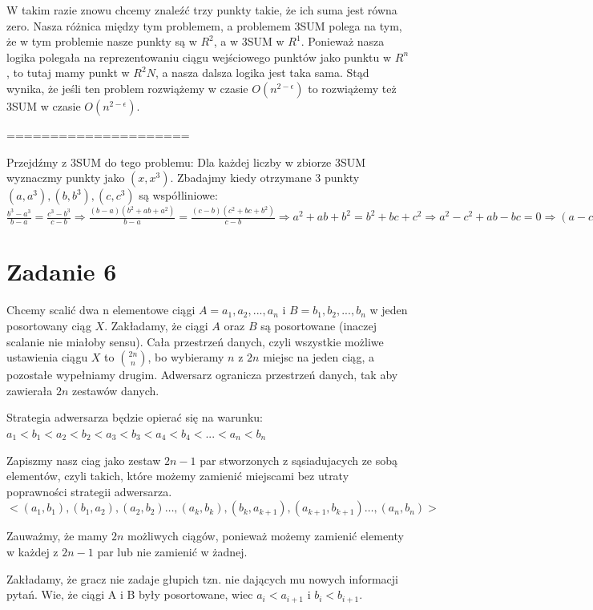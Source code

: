 \documentclass[12pt]{article}
\begin{document}
W takim razie znowu chcemy znaleźć trzy punkty takie, że ich suma jest równa zero. Nasza różnica między tym problemem, a problemem 3SUM polega na tym, że w tym problemie nasze punkty są w $R^2$, a w 3SUM w $R^1$. Ponieważ nasza logika polegała na reprezentowaniu ciągu wejściowego punktów jako punktu w $R^n$, to tutaj mamy punkt w $R^2N$, a nasza dalsza logika jest taka sama. Stąd wynika, że jeśli ten problem rozwiążemy w czasie $O(n^{2-\epsilon})$ to rozwiążemy też 3SUM w czasie $O(n^{2-\epsilon})$.

=====================

Przejdźmy z 3SUM do tego problemu:
Dla każdej liczby w zbiorze 3SUM wyznaczmy punkty jako $(x, x^3)$. Zbadajmy kiedy otrzymane 3 punkty $(a, a^3), (b, b^3), (c, c^3)$ są współliniowe:
$\frac{b^3-a^3}{b-a} = \frac{c^3-b^3}{c-b} \Rightarrow \frac{(b-a)(b^2+ab+a^2)}{b-a} = \frac{(c-b)(c^2+bc+b^2)}{c-b} \Rightarrow a^2+ab+b^2 = b^2+bc+c^2 \Rightarrow a^2-c^2+ab-bc = 0 \Rightarrow (a-c)(a+c) + b(a-c) = 0 \Rightarrow (a-c)(a+b+c) = 0 \Rightarrow a+b+c = 0$

\section{Zadanie 6}

Chcemy scalić dwa n elementowe ciągi $A = a_1, a_2, ..., a_n$ i $B = b_1, b_2, ..., b_n$ w jeden posortowany ciąg $X$. Zakładamy, że ciągi $A$ oraz $B$ są posortowane (inaczej scalanie nie miałoby sensu). 
Cała przestrzeń danych, czyli wszystkie możliwe ustawienia ciągu $X$ to ${2n}\choose{n}$, bo wybieramy $n$ z $2n$ miejsc na jeden ciąg, a pozostałe wypełniamy drugim. 
Adwersarz ogranicza przestrzeń danych, tak aby zawierała $2n$ zestawów danych. 

Strategia adwersarza będzie opierać się na warunku:
$a_1<b_1<a_2<b_2<a_3<b_3<a_4<b_4<...<a_n<b_n$

Zapiszmy nasz ciag jako zestaw $2n-1$ par stworzonych z sąsiadujacych ze sobą elementów, czyli takich, które możemy zamienić miejscami bez utraty poprawności strategii adwersarza.
 $<(a_1, b_1), (b_1, a_2), (a_2, b_2)\dots, (a_k, b_k), (b_k, a_{k+1}), (a_{k+1}, b_{k+1})\dots,(a_n, b_n)>$
 
 Zauważmy, że mamy $2n$ możliwych ciągów, ponieważ możemy zamienić elementy w każdej z $2n-1$ par lub nie zamienić w żadnej.
 
 Zakładamy, że gracz nie zadaje głupich tzn. nie dających mu nowych informacji pytań. Wie, że ciągi A i B były posortowane, wiec $a_i<a_{i+1}$ i $b_i<b_{i+1}$.
 
\end{document}

